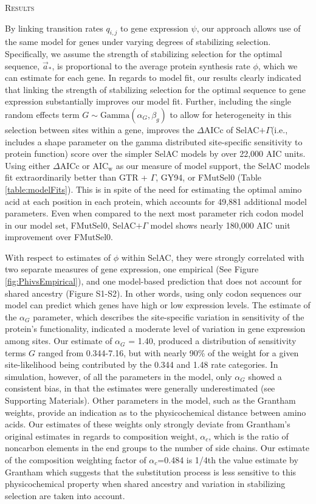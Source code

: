 \documentclass[12pt,letterpaper]{article}
\renewcommand{\section}[1]{%
\bigskip
\begin{center}
\begin{Large}
\normalfont\scshape #1
\medskip
\end{Large}
\end{center}}
\newcommand{\DeltaAICc}{\ensuremath{\Delta\text{AICc}}\xspace}
\newcommand{\AICw}{\ensuremath{\text{AIC}_\text{w}}\xspace}
\newcommand{\selac}{SelAC\xspace}
\newcommand{\selacplusgamma}{SelAC$+\Gamma$\xspace}
\newcommand{\alphac}{\ensuremath{\alpha_c}\xspace}
\newcommand{\alphag}{\ensuremath{\alpha_G}\xspace}
\newcommand{\aoptvec}{\ensuremath{\Vec{a}_*}\xspace}
\newcommand{\qij}{\ensuremath{q_{i,j}}\xspace}
\begin{document}
\section{Results}
By linking transition rates $\qij$ to gene expression $\psi$, our approach allows use of the same model for genes under varying degrees of stabilizing selection.
Specifically, we assume the strength of stabilizing selection for the optimal sequence, \aoptvec, is proportional to the average protein synthesis rate $\phi$, which we can estimate for each gene.
In regards to model fit, our results clearly indicated that linking the strength of stabilizing selection for the optimal sequence to gene expression substantially improves our model fit.
Further, including the single random effects term $G \sim \text{Gamma}(\alphag, \beta_g)$ to allow for heterogeneity in this selection between sites within a gene, improves the \DeltaAICc of \selacplusgamma (i.e., includes a shape parameter on the gamma distributed site-specific sensitivity to protein function) score over the simpler \selac models by over 22,000 AIC units.
Using either \DeltaAICc or \AICw as our measure of model support, the \selac models fit extraordinarily better than GTR + $\Gamma$, GY94, or FMutSel0 (Table \ref{table:modelFits}).
This is in spite of the need for estimating the optimal amino acid at each position in each protein, which accounts for 49,881 additional model parameters.
Even when compared to the next most parameter rich codon model in our model set, FMutSel0, \selacplusgamma model shows nearly 180,000 AIC unit improvement over FMutSel0.

With respect to estimates of $\phi$ within \selac, they were strongly correlated with two separate measures of gene expression, one empirical (See Figure \ref{fig:PhivsEmpirical}), and one model-based prediction that does not account for shared ancestry (Figure S1-S2).
In other words, using only codon sequences our model can predict which genes have high or low expression levels.
The estimate of the $\alphag$ parameter, which describes the site-specific variation in sensitivity of the protein's functionality, indicated a moderate level of variation in gene expression among sites.
Our estimate of $\alphag$ = 1.40, produced a distribution of sensitivity terms $G$ ranged from 0.344-7.16, but with nearly 90\% of the weight for a given site-likelihood being contributed by the 0.344 and 1.48 rate categories.
In simulation, however, of all the parameters in the model, only $\alphag$ showed a consistent bias, in that the estimates were generally underestimated (see Supporting Materials).
Other parameters in the model, such as the Grantham weights, provide an indication as to the physicochemical distance between amino acids.
Our estimates of these weights only strongly deviate from Grantham's \citeyear{Grantham1974} original estimates in regards to composition weight, $\alphac$, which is the ratio of noncarbon elements in the end groups to the number of side chains.
Our estimate of the composition weighting factor of $\alphac$=0.484 is 1/4th the value estimate by Grantham which suggests that the substitution process is less sensitive to this physicochemical property when shared ancestry and variation in stabilizing selection are taken into account.
\end{document}
